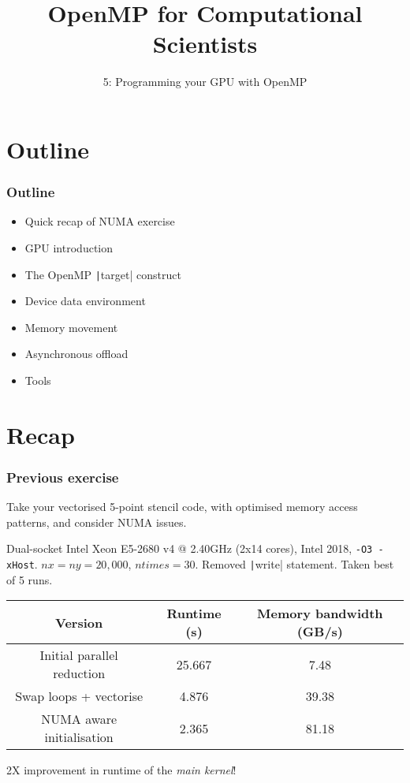 \documentclass{beamer}
\title{OpenMP for Computational Scientists}
\subtitle{5: Programming your GPU with OpenMP}
\begin{document}
\frame{\titlepage}

\section{Outline}
\begin{frame}
\frametitle{Outline}

\begin{itemize}
  \item Quick recap of NUMA exercise
\end{itemize}

\begin{itemize}
  \item GPU introduction
  \item The OpenMP \texttt|target| construct
  \item Device data environment
  \item Memory movement
  \item Asynchronous offload
  \item Tools
\end{itemize}
\end{frame}

\section{Recap}
\begin{frame}
\frametitle{Previous exercise}

Take your vectorised 5-point stencil code, with optimised memory access patterns, and consider NUMA issues.


Dual-socket Intel Xeon E5-2680 v4 @ 2.40GHz (2x14 cores), Intel 2018, {\tt -O3 -xHost}.
$nx=ny=20,000$, $ntimes=30$. Removed \texttt|write| statement. Taken best of 5 runs.

\begin{table}
\begin{tabular}{ccc}
\toprule
Version & Runtime (s) & Memory bandwidth (GB/s)\\
\midrule
Initial parallel reduction & 25.667 &  7.48 \\
Swap loops + vectorise     &  4.876 & 39.38 \\
NUMA aware initialisation  &  2.365 & 81.18 \\
\bottomrule
\end{tabular}
\end{table}

2X improvement in runtime of the \emph{main kernel}!

\end{frame}
\end{document}

